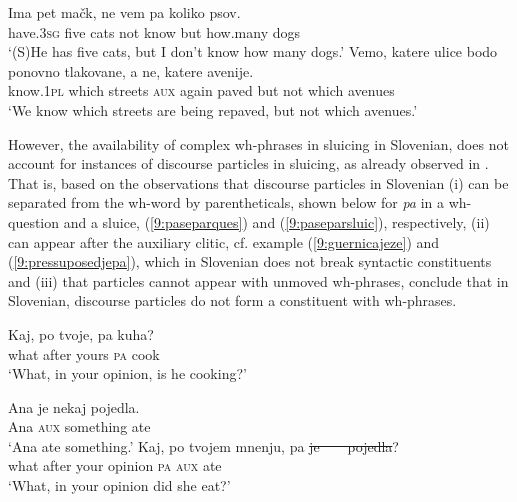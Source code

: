 \documentclass[output=paper,modfonts,newtxmath,hidelinks]{langscibook}
\begin{document}
\begin{exe}
\ex \begin{xlist}
\ex \gll Ima pet mačk, ne vem pa koliko psov.\\
have.\textsc{3sg} five cats not know but how.many dogs\\
\trans `(S)He has five cats, but I don't know how many dogs.'
\ex \gll	Vemo, katere ulice bodo ponovno tlakovane, a ne, katere avenije. \\
		know.\textsc{1pl} which streets \textsc{aux} 	again paved but not which avenues \\
\trans `We know which streets are being repaved, but not which avenues.'
\end{xlist}\end{exe}

\noindent However, the availability of complex wh-phrases in sluicing in Slovenian, does not account for instances of discourse particles in sluicing, as already observed in \cite{marusicetal2015}. That is, based on the observations that discourse particles in Slovenian (i) can be separated from the wh-word by parentheticals, shown below for \textit{pa} in a wh-question and a sluice, (\ref{9:paseparques}) and (\ref{9:paseparsluic}), respectively, (ii) can appear after the auxiliary clitic, cf. example (\ref{9:guernicajeze}) and (\ref{9:pressuposedjepa}), which in Slovenian does not break syntactic constituents and (iii) that particles cannot appear with unmoved wh-phrases, \cite{marusicetal2015} conclude that in Slovenian, discourse particles do not form a constituent with wh-phrases. 

\begin{exe}
\ex \label{9:paseparques}
\gll Kaj, po tvoje, pa kuha?\\
	what after yours \textsc{pa} cook\\
\trans  `What, in your opinion, is he cooking?'
\ex \begin{xlist}
\ex \label{9:paseparsluic}
\gll 	Ana je nekaj pojedla. \\
 		Ana \textsc{aux} something ate\\
 \trans  `Ana ate something.'
\ex \gll Kaj, po tvojem mnenju, pa \sout{je}\sout{\ }\sout{\ }\sout{\ }\sout{\ }\sout{pojedla}?\\
 		what after your opinion \textsc{pa} {\textsc{aux} ate}\\
\trans `What, in your opinion did she eat?'
\end{xlist}\end{exe}
 
\end{document}
